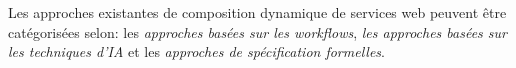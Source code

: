 Les approches existantes de composition dynamique de services web peuvent être catégorisées selon: les \textit{approches basées sur les workflows}, \textit{les approches basées sur les techniques d'IA} et les \textit{approches de spécification formelles}. 




